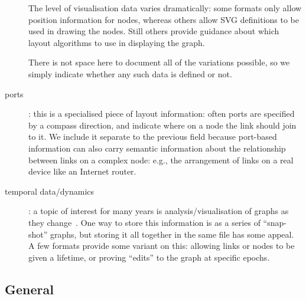 \documentclass{sig-alternate}
\begin{document}
\begin{description}
  The level of visualisation data varies dramatically: some formats
  only allow position information for nodes, whereas others allow SVG
  definitions to be used in drawing the nodes. Still others provide
  guidance about which layout algorithms to use in displaying the
  graph. 

  There is not space here to document all of the variations possible,
  so we simply indicate whether any such data is defined or not. 

\item[ports]: this is a specialised piece of layout information: often
  ports are specified by a compass direction, and indicate where on a
  node the link should join to it. We include it separate to the
  previous field because port-based information can also carry
  semantic information about the relationship between links on a
  complex node: e.g., the arrangement of links on a real device like
  an Internet router. 

\item[temporal data/dynamics]: a topic of interest for many years is
  analysis/visualisation of graphs as they
  change~\cite{ebert87:_versat_data}. One way to store this
  information is as a series of ``snap-shot'' graphs, but storing it
  all together in the same file has some appeal. A few formats provide
  some variant on this: allowing links or nodes to be given a
  lifetime, or proving ``edits'' to the graph at specific epochs.

\end{description}

\subsection{General}
\end{document}
